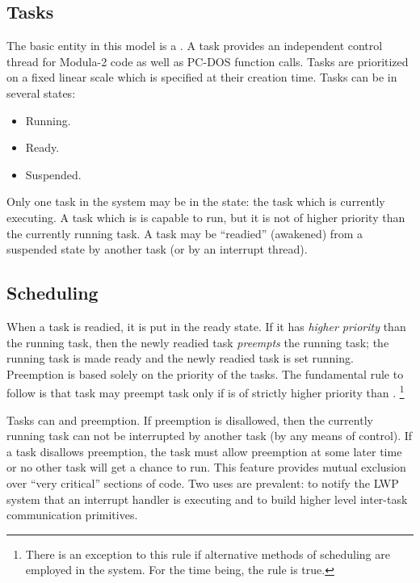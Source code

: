 \subsection{Tasks}

The basic entity in this model is a .  A
task provides an independent control thread for Modula-2 code as well as
PC-DOS function calls.
Tasks are prioritized on a fixed linear
scale which is specified at their creation time.  
Tasks can be in several states:
\begin{itemize}
\item
    Running.
\item
    Ready.
\item
    Suspended.
\end{itemize}


Only one task in the system may be in the  
state: the task which is currently executing.  A task which is
 is capable to run, but it is not of higher priority than the
currently running task.
A task may be ``readied'' (awakened) from a suspended
state by another task (or by an interrupt thread).

\subsection{Scheduling}
\label{sec-sched}

When a task is readied, it is put in the ready state.  If it has 
{\em higher priority} than the running task, then the newly readied
task {\em preempts} the running task; the running task is made
ready and the newly readied task is set running.
Preemption is based solely on the priority of the tasks.
The fundamental rule to follow is
that task  may preempt task  only if  is of strictly 
higher priority than .  
\footnote{There is an exception to this rule if alternative methods of
scheduling are employed in the system.  For the time being, the rule
is true.}

Tasks can  and  preemption.
If preemption is disallowed, then the currently running task can not
be interrupted by another task (by any means of control). 
If a task disallows preemption, the task must allow preemption at some later
time or no other task will get a chance to run.
This feature provides mutual exclusion over ``very critical'' sections 
of code.  Two uses are prevalent: to notify the LWP system that an
interrupt handler is executing and to build higher level inter-task 
communication primitives.

